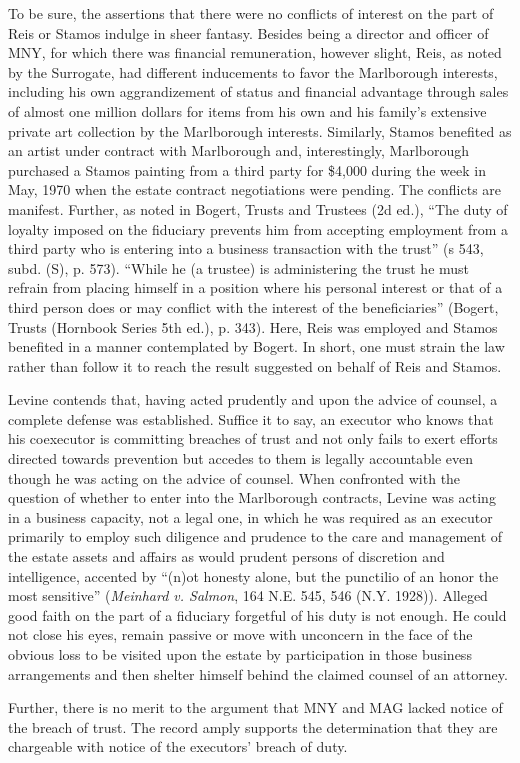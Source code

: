 To be sure, the assertions that there were no conflicts of interest on the part
of Reis or Stamos indulge in sheer fantasy. Besides being a director and officer
of MNY, for which there was financial remuneration, however slight, Reis, as
noted by the Surrogate, had different inducements to favor the Marlborough
interests, including his own aggrandizement of status and financial advantage
through sales of almost one million dollars for items from his own and his
family's extensive private art collection by the Marlborough interests.
Similarly, Stamos benefited as an artist under contract with Marlborough and,
interestingly, Marlborough purchased a Stamos painting from a third party for
\$4,000 during the week in May, 1970 when the estate contract negotiations were
pending. The conflicts are manifest. Further, as noted in Bogert, Trusts and
Trustees (2d ed.), ``The duty of loyalty imposed on the fiduciary prevents him
from accepting employment from a third party who is entering into a business
transaction with the trust'' (s 543, subd. (S), p. 573). ``While he (a trustee)
is administering the trust he must refrain from placing himself in a position
where his personal interest or that of a third person does or may conflict with
the interest of the beneficiaries'' (Bogert, Trusts (Hornbook Series 5th ed.),
p. 343). Here, Reis was employed and Stamos benefited in a manner contemplated
by Bogert. In short, one must strain the law rather than follow it to reach the
result suggested on behalf of Reis and Stamos.

Levine contends that, having acted prudently and upon the advice of counsel, a
complete defense was established. Suffice it to say, an executor who knows that
his coexecutor is committing breaches of trust and not only fails to exert
efforts directed towards prevention but accedes to them is legally accountable
even though he was acting on the advice of counsel. When confronted with the
question of whether to enter into the Marlborough contracts, Levine was acting
in a business capacity, not a legal one, in which he was required as an executor
primarily to employ such diligence and prudence to the care and management of
the estate assets and affairs as would prudent persons of discretion and
intelligence, accented by ``(n)ot honesty alone, but the punctilio of an honor
the most sensitive'' (\emph{Meinhard v. Salmon}, 164 N.E. 545, 546 (N.Y. 1928)).
Alleged good faith on the part of a fiduciary forgetful of his duty is not
enough. He could not close his eyes, remain passive or move with unconcern in
the face of the obvious loss to be visited upon the estate by participation in
those business arrangements and then shelter himself behind the claimed counsel
of an attorney.

Further, there is no merit to the argument that MNY and MAG lacked notice of the
breach of trust. The record amply supports the determination that they are
chargeable with notice of the executors' breach of duty.
